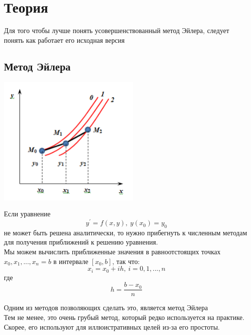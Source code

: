 \documentclass[11pt, english]{article}
\begin{document}
    \newcommand{\CC}{C\nolinebreak\hspace{-.05em}\raisebox{.4ex}{\tiny\bf +}\nolinebreak\hspace{-.10em}\raisebox{.4ex}{\tiny\bf +}}
    \def\CC{{C\nolinebreak[4]\hspace{-.05em}\raisebox{.4ex}{\tiny\bf ++}}}

    \tableofcontents
    \newpage


    \section{Теория}
    Для того чтобы лучше понять усовершенствованный метод Эйлера, следует понять как работает его исходная версия

    \subsection{Метод Эйлера}
    \begin{center}
        \includegraphics[width=7cm]{euler-1.png}
    \end{center}
    Если уравнение $$y^{'} = f(x, y) ,\: y(x_0) = y_0$$ не может быть решена аналитически, то нужно прибегнуть к численным методам для получения приближений к решению уравнения.\\

    Мы можем вычислить приближенные значения в равноотстоящих точках $x_0, x_1, ..., x_n = b$ в интервале $[x_0, b]$, так что:
    $$x_i = x_0 + ih, \: i = 0,1,...,n$$
    где
    $$h = \frac{b - x_0}{n}$$

    Одним из методов позволяющих сделать это, является метод Эйлера\\

    Тем не менее, это очень грубый метод, который редко используется на практике. Скорее, его используют для иллюистративных целей из-за его простоты.\\
\end{document}
